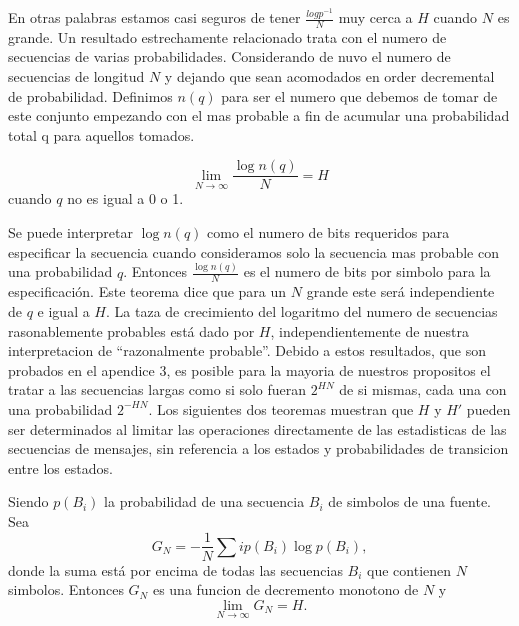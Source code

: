 En otras palabras estamos casi seguros de tener $\frac{log p^{-1}}{N}$
muy cerca a $H$ cuando $N$ es grande.  Un resultado estrechamente
relacionado trata con el numero de secuencias de varias
probabilidades. Considerando de nuvo el numero de secuencias de
longitud $N$ y dejando que sean acomodados en order decremental de
probabilidad. Definimos $n(q)$ para ser el numero que debemos de tomar
de este conjunto empezando con el mas probable a fin de acumular una
probabilidad total q para aquellos tomados.

\begin{theorem}
\begin{equation}
\lim_{N \rightarrow \infty} \frac{\log n(q)}{N} = H
\end{equation}
cuando $q$ no es igual a 0 o 1.
\end{theorem}

Se puede interpretar $\log n(q)$ como el numero de bits requeridos
para especificar la secuencia cuando consideramos solo la secuencia
mas probable con una probabilidad $q$. Entonces $\frac{\log n(q)}{N}$
es el numero de bits por simbolo para la especificaci\'{o}n. Este
teorema dice que para un $N$ grande este ser\'{a} independiente de $q$
e igual a $H$. La taza de crecimiento del logaritmo del numero de
secuencias rasonablemente probables est\'{a} dado por $H$,
independientemente de nuestra interpretacion de ``razonalmente
probable''. Debido a estos resultados, que son probados en el apendice
3, es posible para la mayoria de nuestros propositos el tratar a las
secuencias largas como si solo fueran $2^{HN}$ de si mismas, cada una
con una probabilidad $2^{-HN}$.  Los siguientes dos teoremas muestran
que $H$ y $H'$ pueden ser determinados al limitar las operaciones
directamente de las estadisticas de las secuencias de mensajes, sin
referencia a los estados y probabilidades de transicion entre los
estados.

\begin{theorem}
Siendo $p(B_{i})$ la probabilidad de una secuencia $B_{i}$ de simbolos
de una fuente. Sea
\begin{equation}
G_{N} = - \frac{1}{N} \sum{i}{} p(B_{i}) \log p(B_{i}),
\end{equation}
donde la suma est\'{a} por encima de todas las secuencias $B_{i}$ que
contienen $N$ simbolos. Entonces $G_{N}$ es una funcion de decremento
monotono de $N$ y
\begin{equation}
\lim_{N \rightarrow \infty} G_{N} = H.
\end{equation}
\end{theorem}

